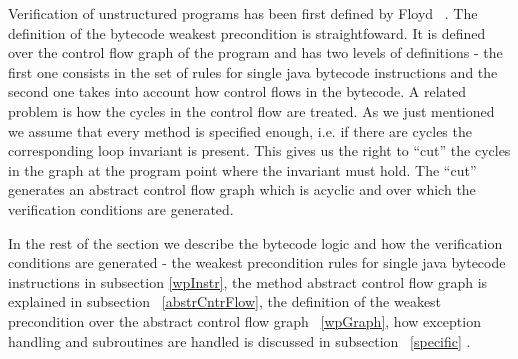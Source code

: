 Verification of unstructured programs has been first defined by Floyd ~\cite{F67amp}. The definition of the bytecode weakest 
precondition is straightfoward.  It is defined over the control flow graph of the program and has two levels of definitions - 
 the first one consists in the set of rules for single java bytecode instructions and the second one takes into account how control
 flows in the bytecode. A related problem is how the cycles in the control flow are treated. 
As we just mentioned we assume that every method is specified enough, i.e. if there are cycles the corresponding 
loop invariant is present. This gives us the right to ``cut'' the cycles in the graph at the program point where the invariant must hold. 
The ``cut'' generates an abstract control flow graph which is acyclic and over which the verification conditions are generated.  

In the rest of the section we describe the bytecode logic  and how the verification conditions are generated -
 the weakest precondition rules for single java bytecode instructions in subsection \ref{wpInstr}, 
 the method abstract control flow graph is explained in subsection ~\ref{abstrCntrFlow}, 
 the definition of the weakest precondition over the abstract control flow graph ~\ref{wpGraph}, 
 how exception handling and subroutines are handled is discussed in subsection ~\ref{specific} .











